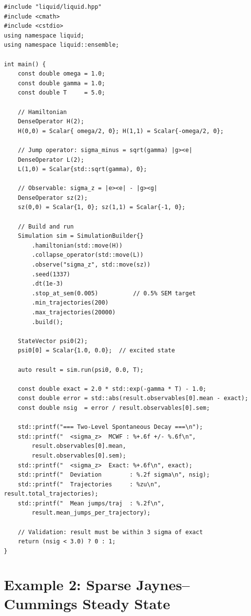 \documentclass[11pt,a4paper,twoside]{book}
\theoremstyle{definition}
\theoremstyle{remark}
\begin{document}
\begin{verbatim}
#include "liquid/liquid.hpp"
#include <cmath>
#include <cstdio>
using namespace liquid;
using namespace liquid::ensemble;

int main() {
    const double omega = 1.0;
    const double gamma = 1.0;
    const double T     = 5.0;

    // Hamiltonian
    DenseOperator H(2);
    H(0,0) = Scalar{ omega/2, 0}; H(1,1) = Scalar{-omega/2, 0};

    // Jump operator: sigma_minus = sqrt(gamma) |g><e|
    DenseOperator L(2);
    L(1,0) = Scalar{std::sqrt(gamma), 0};

    // Observable: sigma_z = |e><e| - |g><g|
    DenseOperator sz(2);
    sz(0,0) = Scalar{1, 0}; sz(1,1) = Scalar{-1, 0};

    // Build and run
    Simulation sim = SimulationBuilder{}
        .hamiltonian(std::move(H))
        .collapse_operator(std::move(L))
        .observe("sigma_z", std::move(sz))
        .seed(1337)
        .dt(1e-3)
        .stop_at_sem(0.005)          // 0.5% SEM target
        .min_trajectories(200)
        .max_trajectories(20000)
        .build();

    StateVector psi0(2);
    psi0[0] = Scalar{1.0, 0.0};  // excited state

    auto result = sim.run(psi0, 0.0, T);

    const double exact = 2.0 * std::exp(-gamma * T) - 1.0;
    const double error = std::abs(result.observables[0].mean - exact);
    const double nsig  = error / result.observables[0].sem;

    std::printf("=== Two-Level Spontaneous Decay ===\n");
    std::printf("  <sigma_z>  MCWF : %+.6f +/- %.6f\n",
        result.observables[0].mean,
        result.observables[0].sem);
    std::printf("  <sigma_z>  Exact: %+.6f\n", exact);
    std::printf("  Deviation        : %.2f sigma\n", nsig);
    std::printf("  Trajectories     : %zu\n", result.total_trajectories);
    std::printf("  Mean jumps/traj  : %.2f\n",
        result.mean_jumps_per_trajectory);

    // Validation: result must be within 3 sigma of exact
    return (nsig < 3.0) ? 0 : 1;
}
\end{verbatim}

\section{Example 2: Sparse Jaynes--Cummings Steady State}
\label{sec:ex-jc}
\end{document}
